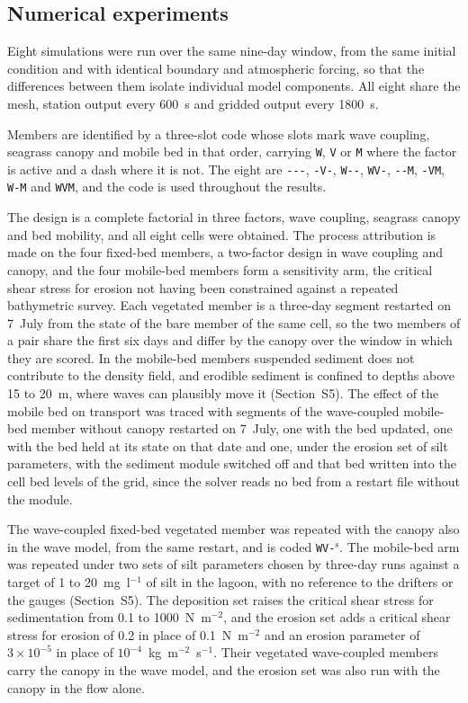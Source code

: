 \subsection{Numerical experiments}
\label{sec:methods_experiments}

Eight simulations were run over the same nine-day window, from the same initial
condition and with identical boundary and atmospheric forcing, so that the
differences between them isolate individual model components. All eight share
the mesh, station output every 600~s and gridded output every 1800~s.

Members are identified by a three-slot code whose slots mark wave coupling,
seagrass canopy and mobile bed in that order, carrying \texttt{W}, \texttt{V}
or \texttt{M} where the factor is active and a dash where it is not. The eight
are \texttt{{-}{-}{-}}, \texttt{{-}V{-}}, \texttt{W{-}{-}}, \texttt{WV{-}},
\texttt{{-}{-}M}, \texttt{{-}VM}, \texttt{W{-}M} and \texttt{WVM}, and the code
is used throughout the results.

The design is a complete factorial in three factors, wave coupling, seagrass
canopy and bed mobility, and all eight cells were obtained. The process
attribution is made on the four fixed-bed members, a two-factor design in wave
coupling and canopy, and the four mobile-bed members form a sensitivity arm,
the critical shear stress for erosion not having been constrained against a
repeated bathymetric survey. Each vegetated member is a three-day segment
restarted on 7~July from the state of the bare member of the same cell, so the
two members of a pair share the first six days and differ by the canopy over
the window in which they are scored. In the mobile-bed members suspended
sediment does not contribute to the density field, and erodible sediment is
confined to depths above 15 to 20~m, where waves can plausibly move it
(Section~S5). The effect of the mobile bed on transport was traced with
segments of the wave-coupled mobile-bed member without canopy restarted on
7~July, one with the bed updated, one with the bed held at its state on that
date and one, under the erosion set of silt parameters, with the sediment
module switched off and that bed written into the cell bed levels of the grid,
since the solver reads no bed from a restart file without the module.

The wave-coupled fixed-bed vegetated member was repeated with the canopy also
in the wave model, from the same restart, and is coded
\texttt{WV{-}}$^{\mathrm{s}}$. The mobile-bed arm was repeated under two sets
of silt parameters chosen by three-day runs against a target of 1 to
20~mg~l$^{-1}$ of silt in the lagoon, with no reference to the drifters or the
gauges (Section~S5). The deposition set raises the critical shear stress for
sedimentation from 0.1 to 1000~N~m$^{-2}$, and the erosion set adds a critical
shear stress for erosion of 0.2 in place of 0.1~N~m$^{-2}$ and an erosion
parameter of $3\times10^{-5}$ in place of $10^{-4}$~kg~m$^{-2}$~s$^{-1}$. Their
vegetated wave-coupled members carry the canopy in the wave model, and the
erosion set was also run with the canopy in the flow alone.


